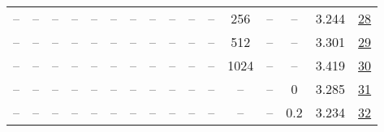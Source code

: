 \begin{table}[H]
\begin{tabular}{cccccccccccccccc}
-- & -- & -- & -- & -- & -- & -- & -- & -- & -- & -- & 256 & -- & -- & 3.244 & \href{https://wandb.ai/stanford-mercury/optimizer-scaling/runs/sweep-300m-6B-muon4f0758lr0.008-wd0.1-minlr0-warmup0-b10.8-b20.9-e54e80}{28} \\
-- & -- & -- & -- & -- & -- & -- & -- & -- & -- & -- & 512 & -- & -- & 3.301 & \href{https://wandb.ai/stanford-mercury/optimizer-scaling/runs/sweep-300m-6B-muon3e237dlr0.008-wd0.1-minlr0-warmup0-b10.8-b20.9-27901a}{29} \\
-- & -- & -- & -- & -- & -- & -- & -- & -- & -- & -- & 1024 & -- & -- & 3.419 & \href{https://wandb.ai/stanford-mercury/optimizer-scaling/runs/sweep-300m-6B-muon40d536lr0.008-wd0.1-minlr0-warmup0-b10.8-b20.9-f7b0ee}{30} \\
-- & -- & -- & -- & -- & -- & -- & -- & -- & -- & -- & -- & -- & 0 & 3.285 & \href{https://wandb.ai/stanford-mercury/optimizer-scaling/runs/sweep-300m-6B-muonabb96blr0.008-wd0-minlr0-warmup0-b10.8-b20.98--2f3d20}{31} \\
-- & -- & -- & -- & -- & -- & -- & -- & -- & -- & -- & -- & -- & 0.2 & 3.234 & \href{https://wandb.ai/stanford-mercury/optimizer-scaling/runs/sweep-300m-6B-muon174a96lr0.008-wd0.2-minlr0-warmup0-b10.8-b20.9-d21c0b}{32} \\
\bottomrule
\end{tabular}
\end{table}


